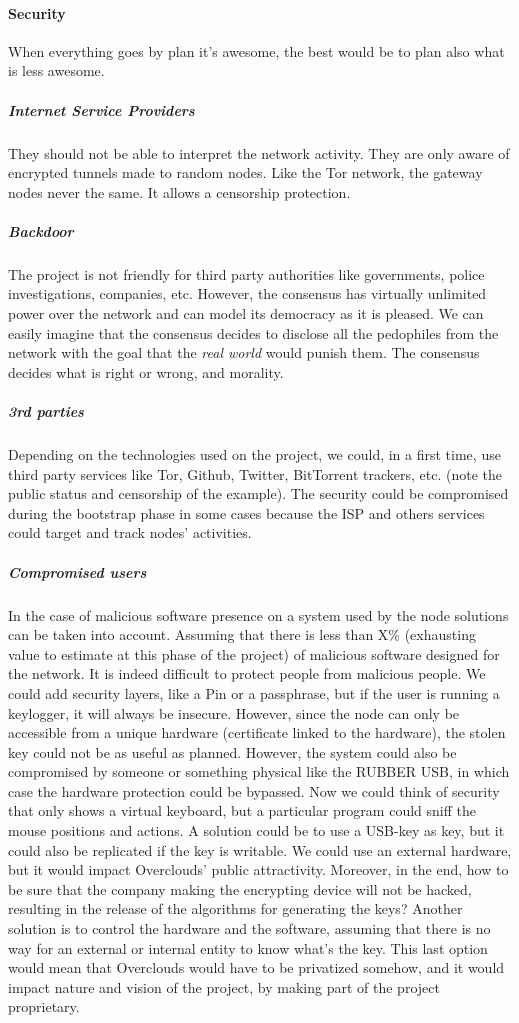 \paragraph{Security} When everything goes by plan it's awesome, the best would be to plan also what is less awesome.

\subparagraph{Internet Service Providers} They should not be able to interpret the network activity. They are only aware of encrypted tunnels made to random nodes. Like the Tor network, the gateway nodes never the same. It allows a censorship protection.

\subparagraph{Backdoor} The project is not friendly for third party authorities like governments, police investigations, companies, etc. However, the consensus has virtually unlimited power over the network and can model its democracy as it is pleased. We can easily imagine that the consensus decides to disclose all the pedophiles from the network with the goal that the \textit{real world} would punish them. The consensus decides what is right or wrong, and morality.

\subparagraph{3rd parties} Depending on the technologies used on the project, we could, in a first time, use third party services like Tor, Github, Twitter, BitTorrent trackers, etc. (note the public status and censorship of the example). The security could be compromised during the bootstrap phase in some cases because the ISP and others services could target and track nodes' activities.

\subparagraph{Compromised users} In the case of malicious software presence on a system used by the node solutions can be taken into account. Assuming that there is less than X\% (exhausting value to estimate at this phase of the project) of malicious software designed for the network. It is indeed difficult to protect people from malicious people. We could add security layers, like a Pin or a passphrase, but if the user is running a keylogger, it will always be insecure. However, since the node can only be accessible from a unique hardware (certificate linked to the hardware), the stolen key could not be as useful as planned. However, the system could also be compromised by someone or something physical like the RUBBER USB\cite{HakshopRubberUSB}, in which case the hardware protection could be bypassed. Now we could think of security that only shows a virtual keyboard, but a particular program could sniff the mouse positions and actions. A solution could be to use a USB-key as key, but it could also be replicated if the key is writable. We could use an external hardware, but it would impact Overclouds' public attractivity. Moreover, in the end, how to be sure that the company making the encrypting device will not be hacked, resulting in the release of the algorithms for generating the keys? Another solution is to control the hardware and the software, assuming that there is no way for an external or internal entity to know what's the key. This last option would mean that Overclouds would have to be privatized somehow, and it would impact nature and vision of the project, by making part of the project proprietary.

